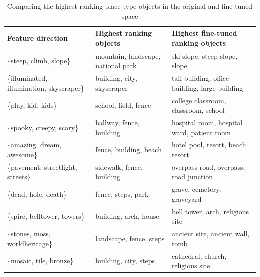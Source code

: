 \begin{table}[t]
	
	\centering
	\setlength{\tabcolsep}{14pt}
	\renewcommand{\arraystretch}{1}
	\scriptsize
	\begin{tabularx}{\textwidth}{l l l}
		\textbf{Feature direction} & Highest ranking objects & Highest fine-tuned ranking objects\\
		\toprule             
		\{steep, climb, slope\}                   & mountain, landscape, national park & ski slope, steep slope, slope                                     \\
		\{illuminated, illumination, skyscraper\} & building, city, skyscraper         & tall building, office building, large building                    \\
		\{play, kid, kids\}                       & school, field, fence               & college classroom, classroom, school                              \\
		\{spooky, creepy, scary\}          & hallway, fence, building             & hospital room, hospital ward, patient room                  \\
		\{amazing, dream, awesome\}                   & fence, building, beach    & hotel pool, resort, beach resort \\
		\{pavement, streetlight, streets\}        & sidewalk, fence, building          & overpass road, overpass, road junction                            \\
		\{dead, hole, death\}                     & fence, steps, park                 & grave, cemetery, graveyard                                        \\
		\{spire, belltower, towers\}              & building, arch, house              & bell tower, arch, religious site                                  \\
		\{stones, moss, worldheritage\}           & landscape, fence, steps            & ancient site, ancient wall, tomb                                  \\
		\{mosaic, tile, bronze\}                  & building, city, steps              & cathedral, church, religious site     \\
	
	\end{tabularx}
	
	\caption{Comparing the highest ranking place-type objects in the original and fine-tuned space}\label{tabTopRanked}
\end{table}


